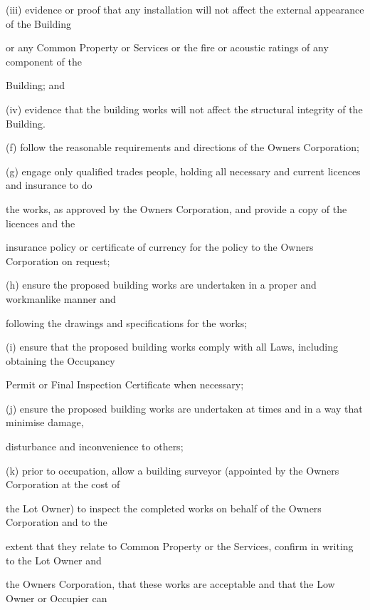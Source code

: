 \documentclass{article}
\begin{document}
{\fontsize{9.962}{1}(iii) evidence or proof that any installation will not affect the external appearance of the Building }

{\fontsize{10.02}{1}or any Common Property or Services or the fire or acoustic ratings of any component of the }

\newpage

{\fontsize{10.02}{1}Building; and }

{\fontsize{9.962}{1}(iv) evidence that the building works will not affect the structural integrity of the Building. }

{\fontsize{9.962}{1}(f) follow the reasonable requirements and directions of the Owners Corporation; }

{\fontsize{9.962}{1}(g) engage only qualified trades people, holding all necessary and current licences and insurance to do }

{\fontsize{10.02}{1}the works, as approved by the Owners Corporation, and provide a copy of the licences and the }

{\fontsize{10.02}{1}insurance policy or certificate of currency for the policy to the Owners Corporation on request; }

{\fontsize{9.962}{1}(h) ensure the proposed building works are undertaken in a proper and workmanlike manner and }

{\fontsize{10.02}{1}following the drawings and specifications for the works; }

{\fontsize{9.962}{1}(i) ensure that the proposed building works comply with all Laws, including obtaining the Occupancy }

{\fontsize{10.02}{1}Permit or Final Inspection Certificate when necessary; }

{\fontsize{9.962}{1}(j) ensure the proposed building works are undertaken at times and in a way that minimise damage, }

{\fontsize{10.02}{1}disturbance and inconvenience to others; }

{\fontsize{9.962}{1}(k) prior to occupation, allow a building surveyor (appointed by the Owners Corporation at the cost of }

{\fontsize{10.02}{1}the Lot Owner) to inspect the completed works on behalf of the Owners Corporation and to the }

{\fontsize{10.02}{1}extent that they relate to Common Property or the Services, confirm in writing to the Lot Owner and }

{\fontsize{10.02}{1}the Owners Corporation, that these works are acceptable and that the Low Owner or Occupier can }
\end{document}
